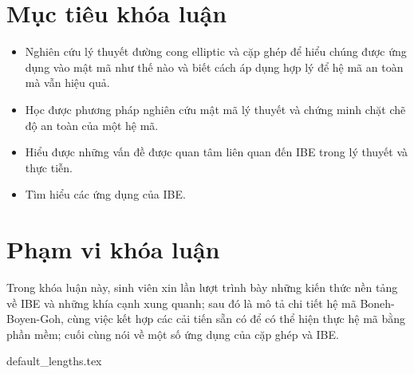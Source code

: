\documentclass[class=report, crop=false]{standalone}
\begin{document}
	\section{Mục tiêu khóa luận}
		\begin{itemize}
			\item Nghiên cứu lý thuyết đường cong elliptic và cặp ghép để hiểu chúng được ứng dụng vào mật mã như thế nào và biết cách áp dụng hợp lý để hệ mã an toàn mà vẫn hiệu quả.
			\item Học được phương pháp nghiên cứu mật mã lý thuyết và chứng minh chặt chẽ độ an toàn của một hệ mã.
			\item Hiểu được những vấn đề được quan tâm liên quan đến IBE trong lý thuyết và thực tiễn.
			\item Tìm hiểu các ứng dụng của IBE.
		\end{itemize}
	\section{Phạm vi khóa luận}
		Trong khóa luận này, sinh viên xin lần lượt trình bày những kiến thức nền tảng về IBE và những khía cạnh xung quanh; sau đó là mô tả chi tiết hệ mã Boneh-Boyen-Goh, cùng việc kết hợp các cải tiến sẵn có để có thể hiện thực hệ mã bằng phần mềm; cuối cùng nói về một số ứng dụng của cặp ghép và IBE.

	\newpage
	{default_lengths.tex}
\end{document}
